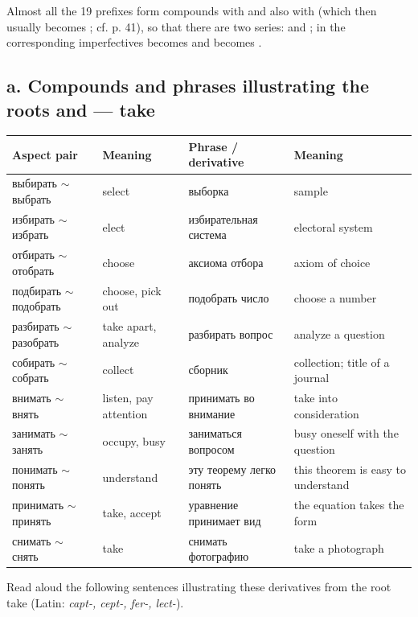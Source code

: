 Almost all the 19 prefixes form compounds with  and also with  (which then usually becomes ; cf. p. 41), so that there are two series:  and ; in the corresponding imperfectives  becomes  and  becomes .

\subsection*{a. Compounds and phrases illustrating the roots  and  --- take}

\begingroup
\small
\setlength{\tabcolsep}{3pt}
\renewcommand{\arraystretch}{1.06}
\begin{longtable}{@{}>{\cyrillicfont}p{39mm}p{27mm}>{\cyrillicfont}p{42mm}p{37mm}@{}}
\toprule
\normalfont Aspect pair & Meaning & \normalfont Phrase / derivative & Meaning\\
\midrule
\endhead
выбирать $\sim$ выбрать & select & выборка & sample\\
избирать $\sim$ избрать & elect & избирательная система & electoral system\\
отбирать $\sim$ отобрать & choose & аксиома отбора & axiom of choice\\
подбирать $\sim$ подобрать & choose, pick out & подобрать число & choose a number\\
разбирать $\sim$ разобрать & take apart, analyze & разбирать вопрос & analyze a question\\
собирать $\sim$ собрать & collect & сборник & collection; title of a journal\\
внимать $\sim$ внять & listen, pay attention & принимать во внимание & take into consideration\\
занимать $\sim$ занять & occupy, busy & заниматься вопросом & busy oneself with the question\\
понимать $\sim$ понять & understand & эту теорему легко понять & this theorem is easy to understand\\
принимать $\sim$ принять & take, accept & уравнение принимает вид & the equation takes the form\\
снимать $\sim$ снять & take & снимать фотографию & take a photograph\\
\bottomrule
\end{longtable}
\endgroup

\begin{keybox}[Exercise 5.4]
Read aloud the following sentences illustrating these derivatives from the root  take (Latin: \emph{capt-, cept-, fer-, lect-}).
\end{keybox}

